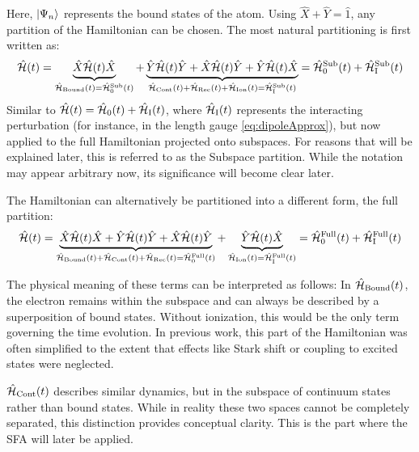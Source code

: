 Here, $\ket{\Psi_n}$ represents the bound states of the atom. Using $\hat{X}+\hat{Y}=\hat{1}$, any partition of the Hamiltonian can be chosen.
The most natural partitioning is first written as:
\begin{equation*}
    \hat{\mathcal{H}}(t) = \underbrace{\hat{X}\hat{\mathcal{H}}(t)\hat{X}}_{\hat{\mathcal{H}}_{\mathrm{Bound}}(t)=\hat{\mathcal{H}}^{\mathrm{Sub}}_0(t)} + \underbrace{\hat{Y}\hat{\mathcal{H}}(t)\hat{Y} + \hat{X}\hat{\mathcal{H}}(t)\hat{Y} + \hat{Y}\hat{\mathcal{H}}(t)\hat{X}}_{\hat{\mathcal{H}}_{\mathrm{Cont}}(t)+\hat{\mathcal{H}}_{\mathrm{Rec}}(t)+\hat{\mathcal{H}}_{\mathrm{Ion}}(t)=\hat{\mathcal{H}}^{\mathrm{Sub}}_{\mathrm{I}}(t)} = \hat{\mathcal{H}}^{\mathrm{Sub}}_0(t)+\hat{\mathcal{H}}^{\mathrm{Sub}}_{\mathrm{I}}(t)
\end{equation*}
Similar to $\hat{\mathcal{H}}(t)=\hat{\mathcal{H}}_0(t)+\hat{\mathcal{H}}_\mathrm{I}(t)$, where $\hat{\mathcal{H}}_\mathrm{I}(t)$ represents the interacting perturbation (for instance, in the length gauge \eqref{eq:dipoleApprox}), but now applied to the full Hamiltonian projected onto subspaces.
For reasons that will be explained later, this is referred to as the Subspace partition.
While the notation may appear arbitrary now, its significance will become clear later.

The Hamiltonian can alternatively be partitioned into a different form, the full partition:
\begin{equation*}
    \hat{\mathcal{H}}(t) = \underbrace{\hat{X}\hat{\mathcal{H}}(t)\hat{X} + \hat{Y}\hat{\mathcal{H}}(t)\hat{Y} + \hat{X}\hat{\mathcal{H}}(t)\hat{Y}}_{\hat{\mathcal{H}}_{\mathrm{Bound}}(t)+\hat{\mathcal{H}}_{\mathrm{Cont}}(t)+\hat{\mathcal{H}}_{\mathrm{Rec}}(t)=\hat{\mathcal{H}}^{\mathrm{Full}}_0(t)} + \underbrace{\hat{Y}\hat{\mathcal{H}}(t)\hat{X}}_{\hat{\mathcal{H}}_{\mathrm{Ion}}(t) = \hat{\mathcal{H}}^{\mathrm{Full}}_{\mathrm{I}}(t)} = \hat{\mathcal{H}}^{\mathrm{Full}}_0(t)+\hat{\mathcal{H}}^{\mathrm{Full}}_{\mathrm{I}}(t)
\end{equation*}

The physical meaning of these terms can be interpreted as follows:
In $\hat{\mathcal{H}}_{\mathrm{Bound}}(t)$, the electron remains within the subspace and can always be described by a superposition of bound states.
Without ionization, this would be the only term governing the time evolution.
In previous work, this part of the Hamiltonian was often simplified to the extent that effects like Stark shift or coupling to excited states were neglected.

$\hat{\mathcal{H}}_{\mathrm{Cont}}(t)$ describes similar dynamics, but in the subspace of continuum states rather than bound states.
While in reality these two spaces cannot be completely separated, this distinction provides conceptual clarity.
This is the part where the SFA will later be applied.

